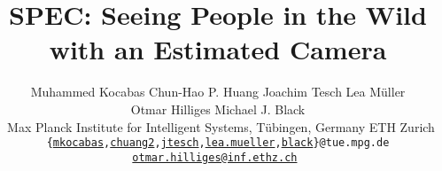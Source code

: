 \documentclass[10pt,twocolumn,letterpaper,usenames,dvipsnames]{article}
\begin{document}
\title{SPEC: Seeing People in the Wild with an Estimated Camera}

\author{Muhammed Kocabas\quad \; Chun-Hao P. Huang\quad \; Joachim Tesch \quad \; Lea M\"uller \quad \; \\ Otmar Hilliges\quad \; Michael J. Black\\\
  \normalsize Max Planck Institute for Intelligent Systems, T\"{u}bingen, Germany \quad
  \normalsize ETH Zurich\\
  \normalsize \texttt{\{\href{mailto:mkocabas@tue.mpg.de}{mkocabas},\href{mailto:nathanasiou@tue.mpg.de}{chuang2},\href{mailto:joachim.tesch@tuebingen.mpg.de}{jtesch},\href{mailto:lea.mueller@tuebingen.mpg.de}{lea.mueller},\href{mailto:black@tue.mpg.de}{black}\}@tue.mpg.de} \quad 
  \texttt{\href{mailto:otmar.hilliges@inf.ethz.ch}{otmar.hilliges@inf.ethz.ch} }
}
\newcommand{\mkocabas}[1]{\textcolor{cyan}{[MK: {#1}]}}
\newcommand{\eaksan}[1]{\textcolor{blue}{[EA: {#1}]}}
\newcommand{\phuang}[1]{\textcolor{red}{[PH: {#1}]}}
\newcommand{\otmar}[1]{\textcolor{orange}{[OH: {#1}]}}
\newcommand{\michael}[1]{\textcolor{magenta}{[MJB: {#1}]}}
\newcommand{\lea}[1]{\textcolor{olive}{[LM: {#1}]}}
\newcommand{\oh}[1]{\otmar{#1}}


\newcommand{\predTheta}{\hat{\mathbf{\Theta}}}
\newcommand{\predShape}{\hat{\mathbf{\beta}}}
\newcommand{\predPose}{\hat{\mathbf{\theta}}}
	
\newcommand{\gtTheta}{\mathbf{\Theta}}
\newcommand{\gtShape}{\mathbf{\beta}}
\newcommand{\gtPose}{\mathbf{\theta}}

\newcommand{\motionDisc}{\mathcal{D}_M}	
\newcommand{\generator}{\mathcal{G}}
\newcommand{\smpl}{\mathcal{M}}	

\newcommand{\focalx}{f_x}
\newcommand{\focaly}{f_y}	
\newcommand{\centerx}{o_x}
\newcommand{\centery}{o_y}
\newcommand{\campos}{C}
\newcommand{\camtransl}{t^c}
\newcommand{\camrot}{R^c}
\newcommand{\imgwidth}{w}
\newcommand{\imgheight}{h}
\newcommand{\cropwidth}{w_{bbox}}
\newcommand{\cropheight}{h_{bbox}}
\newcommand{\cropcenterx}{c_x}
\newcommand{\cropcentery}{c_y}
\newcommand{\predjoints}[1]{\hat{\mathcal{J}}_{\mathit{#1D}}}
\newcommand{\gtjoints}[1]{\mathcal{J}_{\mathit{#1D}}}

\newcommand{\bodytransl}{t^b}
\newcommand{\bodyori}{R^b}

\newcommand{\pampjpe}{PA-MPJPE\xspace}
\newcommand{\wmpjpe}{W-MPJPE\xspace}
\newcommand{\cmpjpe}{C-MPJPE\xspace}
\newcommand{\mpjpe}{MPJPE\xspace}
\newcommand{\wpve}{W-PVE\xspace}
\newcommand{\cpve}{C-PVE\xspace}
\newcommand{\pve}{PVE\xspace}
\end{document}
